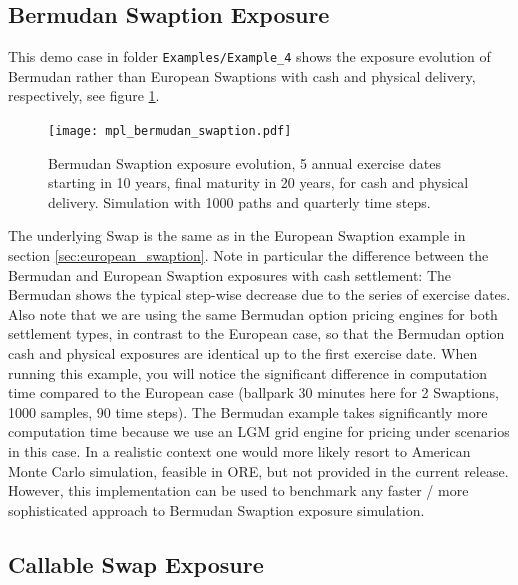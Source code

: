 \documentclass[12pt, a4paper]{article}
\begin{document}
\subsection{Bermudan Swaption Exposure}

This demo case in folder {\tt Examples/Example\_4} shows the exposure evolution of Bermudan rather than European
Swaptions with cash and physical delivery, respectively, see figure \ref{fig_3b}.
\begin{figure}[h!]
\begin{center}
\texttt{[image: mpl\_bermudan\_swaption.pdf]}
\end{center}
\caption{Bermudan Swaption exposure evolution, 5 annual exercise dates starting in 10 years, final maturity in 20 years,
  for cash and physical delivery. Simulation with 1000 paths and quarterly time steps.}
\label{fig_3b}
\end{figure}
The underlying Swap is the same as in the European Swaption example in section \ref{sec:european_swaption}. Note in
particular the difference between the Bermudan and European Swaption exposures with cash settlement: The Bermudan shows
the typical step-wise decrease due to the series of exercise dates. Also note that we are using the same Bermudan option
pricing engines for both settlement types, in contrast to the European case, so that the Bermudan option cash and
physical exposures are identical up to the first exercise date. When running this example, you will notice the
significant difference in computation time compared to the European case (ballpark 30 minutes here for 2 Swaptions, 1000
samples, 90 time steps). The Bermudan example takes significantly more computation time because we use an LGM grid
engine for pricing under scenarios in this case. In a realistic context one would more likely resort to American Monte
Carlo simulation, feasible in ORE, but not provided in the current release. However, this implementation can be used to
benchmark any faster / more sophisticated approach to Bermudan Swaption exposure simulation.

\subsection{Callable Swap Exposure}
\end{document}
